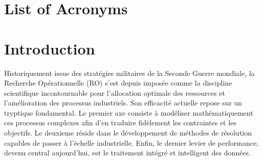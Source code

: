 \documentclass[12pt, a4paper, twoside]{report}
\numberwithin{equation}{section}
\begin{document}
	
	\vspace*{\fill}
	
	\clearpage
	\restoregeometry
	
	\clearpage
	\tableofcontents
	\thispagestyle{empty}
	
	\clearpage
	\listoffigures
	
	\clearpage
	\listoftables
	
	\clearpage
	\section*{List of Acronyms}
	\begin{acronym}[ANITI]
	\end{acronym}
	
	\clearpage
	
	
	\section*{Introduction}
	
	Historiquement issue des stratégies militaires de la Seconde Guerre mondiale, la Recherche Opérationnelle (RO) s'est depuis imposée comme la discipline scientifique incontournable pour l'allocation optimale des ressources et l'amélioration des processus industriels.
	Son efficacité actuelle repose sur un tryptique fondamental. Le premier axe consiste à modéliser mathématiquement ces processus complexes afin d'en traduire fidèlement les contraintes et les objectifs.
	Le deuxieme réside dans le développement de méthodes de résolution capables de passer à l'échelle industrielle. Enfin, le dernier levier de performance, devenu central aujourd'hui, est le traitement intégré et intelligent des données.
	
\end{document}
